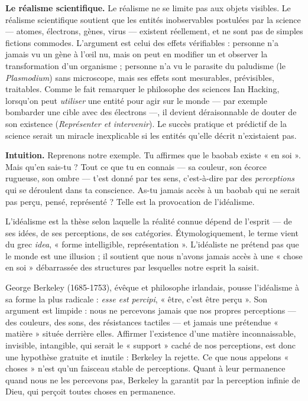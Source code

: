 \documentclass[11pt]{article}
\newcommand{\cle}[1]{{\popxbold\color{popdark}#1}}
\newcounter{popsec}
\newcounter{popsub}
\newcommand{\courssub}[1]{%
  \stepcounter{popsub}%
  \par\vspace{9pt}\noindent{\popxbold\fontsize{11.5}{13}\selectfont\color{popink}{\color{poporange}\thepopsec.\thepopsub}\hspace{6pt}#1}\par\nopagebreak\vspace{4pt}
}
\begin{document}
\textbf{Le réalisme scientifique.} Le réalisme ne se limite pas aux objets visibles. Le \cle{réalisme scientifique} soutient que les entités inobservables postulées par la science — atomes, électrons, gènes, virus — existent réellement, et ne sont pas de simples fictions commodes. L'argument est celui des effets vérifiables : personne n'a jamais vu un gène à l'œil nu, mais on peut en modifier un et observer la transformation d'un organisme ; personne n'a vu le parasite du paludisme (le \emph{Plasmodium}) sans microscope, mais ses effets sont mesurables, prévisibles, traitables. Comme le fait remarquer le philosophe des sciences Ian Hacking, lorsqu'on peut \emph{utiliser} une entité pour agir sur le monde — par exemple bombarder une cible avec des électrons —, il devient déraisonnable de douter de son existence (\emph{Représenter et intervenir}). Le succès pratique et prédictif de la science serait un miracle inexplicable si les entités qu'elle décrit n'existaient pas.

\courssub{L'idéalisme : le monde connu dépend de l'esprit}

\textbf{Intuition.} Reprenons notre exemple. Tu affirmes que le baobab existe « en soi ». Mais qu'en sais-tu ? Tout ce que tu en connais — sa couleur, son écorce rugueuse, son ombre — t'est donné par tes sens, c'est-à-dire par des \emph{perceptions} qui se déroulent dans ta conscience. As-tu jamais accès à un baobab qui ne serait pas perçu, pensé, représenté ? Telle est la provocation de l'idéalisme.

\begin{definition}[L'idéalisme]
L'\cle{idéalisme} est la thèse selon laquelle la réalité connue dépend de l'esprit — de ses idées, de ses perceptions, de ses catégories. Étymologiquement, le terme vient du grec \emph{idea}, « forme intelligible, représentation ». L'idéaliste ne prétend pas que le monde est une illusion ; il soutient que nous n'avons jamais accès à une « chose en soi » débarrassée des structures par lesquelles notre esprit la saisit.
\end{definition}

\begin{propriete}
George Berkeley (1685-1753), évêque et philosophe irlandais, pousse l'idéalisme à sa forme la plus radicale : \emph{esse est percipi}, « être, c'est être perçu ». Son argument est limpide : nous ne percevons jamais que nos propres perceptions — des couleurs, des sons, des résistances tactiles — et jamais une prétendue « matière » située derrière elles. Affirmer l'existence d'une matière inconnaissable, invisible, intangible, qui serait le « support » caché de nos perceptions, est donc une hypothèse gratuite et inutile : Berkeley la rejette. Ce que nous appelons « choses » n'est qu'un faisceau stable de perceptions. Quant à leur permanence quand nous ne les percevons pas, Berkeley la garantit par la perception infinie de Dieu, qui perçoit toutes choses en permanence.
\end{propriete}
\end{document}
